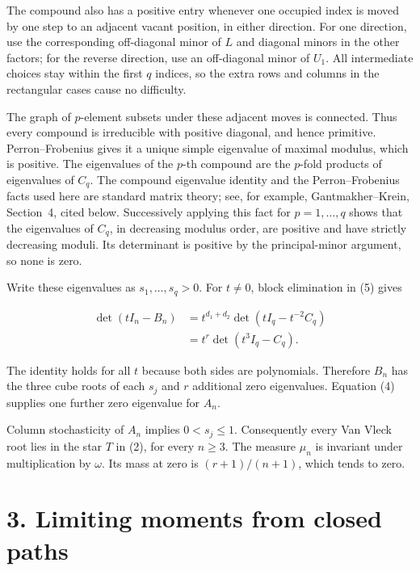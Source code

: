 \documentclass[11pt,a4paper]{article}
\begin{document}
The compound also has a positive entry whenever one occupied index is
moved by one step to an adjacent vacant position, in either direction.
For one direction, use the corresponding off-diagonal minor of \(L\) and
diagonal minors in the other factors; for the reverse direction, use an
off-diagonal minor of \(U_1\). All intermediate choices stay within the
first \(q\) indices, so the extra rows and columns in the rectangular
cases cause no difficulty.

The graph of \(p\)-element subsets under these adjacent moves is
connected. Thus every compound is irreducible with positive diagonal,
and hence primitive. Perron--Frobenius gives it a unique simple
eigenvalue of maximal modulus, which is positive. The eigenvalues of the
\(p\)-th compound are the \(p\)-fold products of eigenvalues of \(C_q\).
The compound eigenvalue identity and the Perron--Frobenius facts used
here are standard matrix theory; see, for example,
Gantmakher--Krein, Section~4, cited below.
Successively applying this fact for \(p=1,\ldots,q\) shows that the
eigenvalues of \(C_q\), in decreasing modulus order, are positive and
have strictly decreasing moduli. Its determinant is positive by the
principal-minor argument, so none is zero.

Write these eigenvalues as \(s_1,\ldots,s_q>0\). For \(t\ne0\), block
elimination in (5) gives

\[
\begin{aligned}
\det(tI_n-B_n)
&=t^{d_1+d_2}\det(tI_q-t^{-2}C_q)\\
&=t^r\det(t^3I_q-C_q).
\end{aligned}
\tag{7}
\]

The identity holds for all \(t\) because both sides are polynomials.
Therefore \(B_n\) has the three cube roots of each \(s_j\) and \(r\)
additional zero eigenvalues. Equation (4) supplies one further zero
eigenvalue for \(A_n\).

Column stochasticity of \(A_n\) implies \(0<s_j\leq1\). Consequently
every Van Vleck root lies in the star \(T\) in (2), for every
\(n\geq3\). The measure \(\mu_n\) is invariant under multiplication by
\(\omega\). Its mass at zero is \((r+1)/(n+1)\), which tends to zero.

\hypertarget{1032-limiting-moments-from-closed-paths}{%
\section{3. Limiting moments from closed
paths}\label{1032-limiting-moments-from-closed-paths}}
\end{document}
